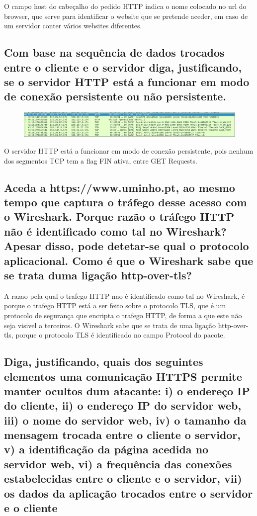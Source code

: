 \documentclass{article}
\begin{document}
O campo host do cabeçalho do pedido HTTP indica o nome colocado no url do browser, que serve para identificar o website que se pretende aceder, em caso de um servidor conter vários websites diferentes.

\subsection{Com base na sequência de dados trocados entre o cliente e o servidor diga, justificando, se o servidor
HTTP está a funcionar em modo de conexão persistente ou não persistente.}

\begin{figure}[h]
    \centering
    \includegraphics[width=1\linewidth]{images/conexao.png}
\end{figure}

O servidor HTTP está a funcionar em modo de conexão persistente, pois nenhum dos segmentos TCP tem a flag FIN ativa, entre GET Requests.

\subsection{Aceda a https://www.uminho.pt, ao mesmo tempo que captura o tráfego desse acesso com o Wireshark.
Porque razão o tráfego HTTP não é identificado como tal no Wireshark? Apesar disso, pode detetar-se
qual o protocolo aplicacional. Como é que o Wireshark sabe que se trata duma ligação http-over-tls?}

A razao pela qual o trafego HTTP nao é identificado como tal no Wireshark, é porque o trafego HTTP está a ser feito sobre o protocolo TLS, que é um protocolo de segurança que encripta o trafego HTTP, de forma a que este não seja visivel a terceiros. O Wireshark sabe que se trata de uma ligação http-over-tls, porque o protocolo TLS é identificado no campo Protocol do pacote.

\subsection{Diga, justificando, quais dos seguintes elementos uma comunicação HTTPS permite manter ocultos dum
atacante: i) o endereço IP do cliente, ii) o endereço IP do servidor web, iii) o nome do servidor web, iv) o
tamanho da mensagem trocada entre o cliente o servidor, v) a identificação da página acedida no servidor
web, vi) a frequência das conexões estabelecidas entre o cliente e o servidor, vii) os dados da aplicação
trocados entre o servidor e o cliente}
\end{document}
